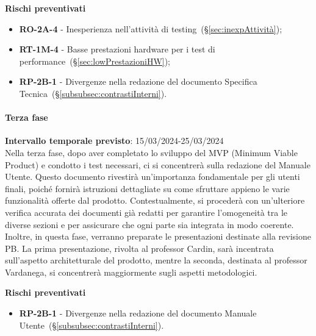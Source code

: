 \vspace{0.4cm}

\textbf{Rischi preventivati}
\begin{itemize}
    \item \textbf{RO-2A-4} - Inesperienza nell’attività di testing~(\S\ref{sec:inexpAttività});
    \item \textbf{RT-1M-4} - Basse prestazioni hardware per i test di performance~(\S\ref{sec:lowPrestazioniHW});
    \item \textbf{RP-2B-1} - Divergenze nella redazione del documento Specifica Tecnica~(\S\ref{subsubsec:contrastiInterni}).
\end{itemize}

\paragraph{Terza fase}

\textbf{Intervallo temporale previsto}: 15/03/2024-25/03/2024 \\ 

Nella terza fase, dopo aver completato lo sviluppo del MVP (Minimum Viable Product) e condotto i test necessari, ci si concentrerà sulla redazione del Manuale Utente. Questo documento rivestirà un'importanza fondamentale per gli utenti finali, poiché fornirà istruzioni dettagliate su come sfruttare appieno le varie funzionalità offerte dal prodotto.
Contestualmente, si procederà con un’ulteriore verifica accurata dei documenti già redatti per garantire l’omogeneità tra le diverse sezioni e per assicurare che ogni parte sia integrata in modo coerente. 
Inoltre, in questa fase, verranno preparate le presentazioni destinate alla revisione PB. La prima presentazione, rivolta al professor Cardin, sarà incentrata sull'aspetto architetturale del prodotto, mentre la seconda, destinata al professor Vardanega, si concentrerà maggiormente sugli aspetti metodologici. 

\vspace{0.4cm}

\textbf{Rischi preventivati} 
\begin{itemize}
    \item \textbf{RP-2B-1} - Divergenze nella redazione del documento Manuale Utente~(\S\ref{subsubsec:contrastiInterni}).
\end{itemize}


